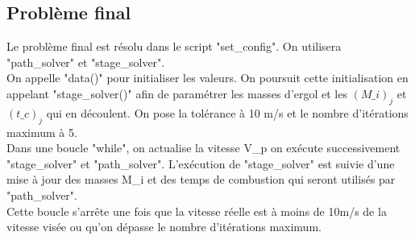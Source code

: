 \subsection{Problème final}\medbreak

Le problème final est résolu dans le script "set\_config". On utilisera "path\_solver" et "stage\_solver".\\
On appelle "data()" pour initialiser les valeurs. On poursuit cette initialisation en appelant "stage\_solver()" afin de paramétrer les masses d'ergol et les $(M\_i)_j$ et $(t\_c)_j$ qui en découlent. On pose la tolérance à 10 m/s et le nombre d'itérations maximum à 5.\\
Dans une boucle "while", on actualise la vitesse V\_p on exécute successivement "stage\_solver" et "path\_solver". L'exécution de "stage\_solver" est suivie d'une mise à jour des masses M\_i et des temps de combustion qui seront utilisés par "path\_solver".\\
Cette boucle s'arrête une fois que la vitesse réelle est à moins de 10m/s de la vitesse visée ou qu'on dépasse le nombre d'itérations maximum.
